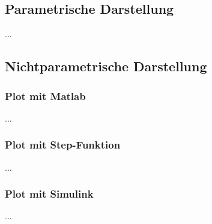 \documentclass[
  ngerman
  ,12pt
  ,pdftex
]{article}
\begin{document}
\subsection{Parametrische Darstellung} %
...
\subsection{Nichtparametrische Darstellung}
\subsubsection{Plot mit Matlab}

...
\subsubsection{Plot mit Step-Funktion}
...
\subsubsection{Plot mit Simulink}
...
\end{document}
